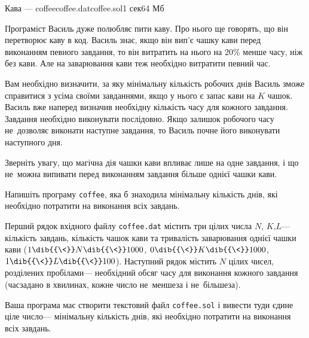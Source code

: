 \begin{problem}{Кава --- coffee}{coffee.dat}{coffee.sol}{1 сек}{64 Мб}

Програміст Василь дуже полюбляє пити каву. Про нього ще говорять, що він перетворює каву в код. Василь знає, якщо він вип'є чашку кави перед виконанням певного завдання, то він витратить на нього на 20\% менше часу, ніж без кави. Але на заварювання кави теж необхідно витратити певний час.

Вам необхідно визначити, за яку мінімальну кількість робочих днів Василь зможе справитися з усіма своїми завданнями, якщо у нього є запас кави на $K$ чашок. Василь вже наперед визначив необхідну кількість часу для кожного завдання. Завдання необхідно виконувати послідовно. Якщо залишок робочого часу не~дозволяє виконати наступне завдання, то Василь почне його виконувати наступного дня. 

Зверніть увагу, що магічна дія чашки кави впливає лише на одне завдання, і що не~можна випивати перед виконанням завдання більше однієї чашки кави.

\Task
Напишіть програму \texttt{coffee}, яка б знаходила мінімальну кількість днів, які необхідно потратити на виконання всіх завдань.

\InputFile
Перший рядок вхідного файлу \texttt{coffee.dat} містить три цілих числа $N$, $K$,\nolinebreak[2] $L$\nolinebreak[3] ---  кількість завдань, кількість чашок кави та тривалість заварювання однієї чашки кави ($1\dib{{\<}}N\dib{{\<}}1000$,\hspace{0.25em plus 0.25em} $0\dib{{\<}}K\dib{{\<}}1000$,\hspace{0.25em plus 0.25em} $1\dib{{\<}}L\dib{{\<}}100$). Наступний рядок містить $N$ цілих чисел, розділених пробілами\nolinebreak[3] --- необхідний обсяг часу для виконання кожного завдання (час\nolinebreak[2] задано в хвилинах, кожне число не~менше\nolinebreak[2] за і не~більше\nolinebreak[2] за).

\OutputFile
Ваша програма має створити текстовий файл \texttt{coffee.sol} і вивести туди єдине ціле число\nolinebreak[3] --- мінімальну кількість днів, які необхідно потратити на виконання всіх завдань.

\Examples
\ifAfour\else
\par\noindent
\fi
\begin{exampleWidthsAndDefaultFileNames}{8em}{3em}
%
\end{exampleWidthsAndDefaultFileNames}
\begin{exampleWidthsAndDefaultFileNames}{9.5em}{3em}
%
\end{exampleWidthsAndDefaultFileNames}

\end{problem}


